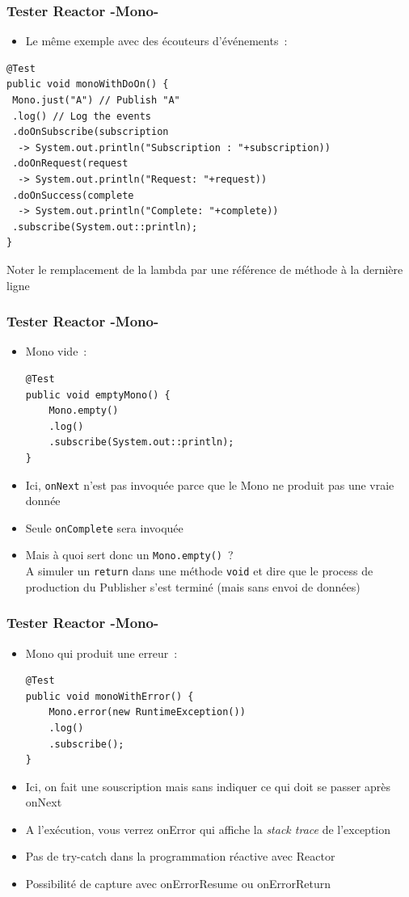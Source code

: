 \documentclass{beamer}
\begin{document}
\begin{frame}[fragile]
	\frametitle{Tester Reactor -Mono-}	
	
	\begin{itemize}
		\item Le même exemple avec des écouteurs d'événements~:
	\end{itemize}
\begin{lstlisting}
@Test
public void monoWithDoOn() {
 Mono.just("A") // Publish "A"
 .log() // Log the events
 .doOnSubscribe(subscription 
  -> System.out.println("Subscription : "+subscription))
 .doOnRequest(request 
  -> System.out.println("Request: "+request))
 .doOnSuccess(complete 
  -> System.out.println("Complete: "+complete))
 .subscribe(System.out::println);
}
\end{lstlisting}
	Noter le remplacement de la lambda par une référence de méthode à la dernière ligne
\end{frame}

\begin{frame}[fragile]
	\frametitle{Tester Reactor -Mono-}	
	
	\begin{itemize}
		\item Mono vide~:
\begin{lstlisting}
@Test
public void emptyMono() {
	Mono.empty()
	.log()
	.subscribe(System.out::println);
}
\end{lstlisting}
\item Ici, \texttt{onNext} n'est pas invoquée parce que le Mono ne produit pas une vraie donnée
\item Seule \texttt{onComplete} sera invoquée
\item Mais à quoi sert donc un \texttt{Mono.empty()}~?\\ A simuler un \texttt{return}  dans une méthode \texttt{void} et dire que le process de production du Publisher s'est terminé (mais sans envoi de données)
	\end{itemize}
\end{frame}

\begin{frame}[fragile]
	\frametitle{Tester Reactor -Mono-}	
	
	\begin{itemize}
		\item Mono qui produit une erreur~:
\begin{lstlisting}
@Test
public void monoWithError() {
	Mono.error(new RuntimeException())
	.log()
	.subscribe();
}
\end{lstlisting}
\item Ici, on fait une souscription mais sans indiquer ce qui doit se passer après onNext
\item A l'exécution, vous verrez onError qui affiche la \textit{stack trace} de l'exception
\item Pas de try-catch dans la programmation réactive avec Reactor
\item Possibilité de capture avec onErrorResume ou onErrorReturn
	\end{itemize}
\end{frame}
\end{document}
